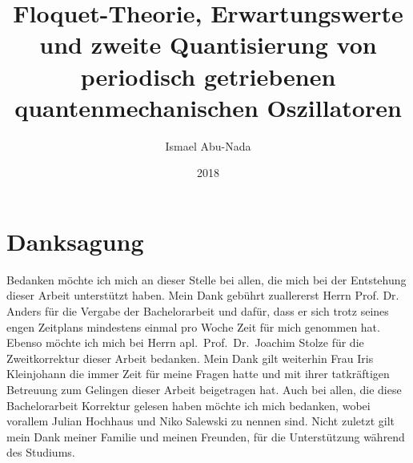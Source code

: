 \documentclass[
  tucolor,
  BCOR=12mm,     %
  DIV = 14,      %
  parskip=half,  %
  open=any,      %
  cleardoublepage=plain,  %
]{tudothesis}
\author{Ismael Abu-Nada}
\title{Floquet-Theorie, Erwartungswerte und zweite Quantisierung von periodisch getriebenen quantenmechanischen Oszillatoren}
\date{2018}
\begin{document}
\frontmatter
%
\maketitle

\makecorrectorpage


\tableofcontents

\mainmatter







\appendix


\backmatter
\printbibliography
\newpage
\thispagestyle{plain}
\section*{Danksagung}
Bedanken möchte ich mich an dieser Stelle bei allen, die mich bei der Entstehung dieser Arbeit unterstützt haben.
Mein Dank gebührt zuallererst Herrn Prof. Dr. Anders für die Vergabe der Bachelorarbeit und dafür, dass er sich trotz seines engen Zeitplans mindestens einmal pro Woche Zeit für mich genommen hat.
Ebenso möchte ich mich bei Herrn apl.~Prof.~Dr.~Joachim Stolze für die Zweitkorrektur dieser Arbeit bedanken.
Mein Dank gilt weiterhin Frau Iris Kleinjohann die immer Zeit für meine Fragen hatte und mit ihrer tatkräftigen Betreuung zum Gelingen dieser Arbeit beigetragen hat.
Auch bei allen, die diese Bachelorarbeit Korrektur gelesen haben möchte ich mich bedanken, wobei vorallem Julian Hochhaus und Niko Salewski zu nennen sind.
Nicht zuletzt gilt mein Dank meiner Familie und meinen Freunden, für die Unterstützung während des Studiums.

\cleardoublepage

\end{document}
